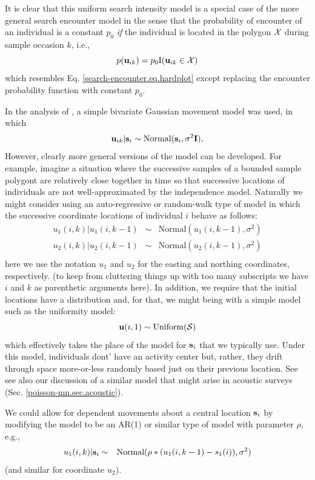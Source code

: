 It is clear that this uniform search intensity model is a
special case of the more general search encounter model in the sense
that the probability of encounter of an individual is a constant
$p_{0}$ {\it if} the individual is located in the polygon ${\cal X}$
during sample occasion $k$,  i.e.,
\[
p({\bf u}_{ik}) = p_{0} \mbox{I}({\bf u}_{ik} \in {\cal X})
\]
which resembles Eq. \ref{search-encounter.eq.hardplot} except
replacing the encounter probability function with constant $p_{0}$.

In the analysis of \citet{royle_young:2008}, a simple bivariate
Gaussian movement model was used, in which
\[
 {\bf u}_{ik} | {\bf s}_{i} \sim \mbox{Normal}({\bf s}_{i}, \sigma^{2}{\bf I}),
\]
However, clearly more general versions of the model can be developed.
For example, imagine a situation where the successive samples of a
bounded sample polygont are relatively close together in time so that
successive locations of individuals are not well-approximated by the
independence model. Naturally we might consider using an
auto-regressive or random-walk type of model in which
the successive coordinate locations of individual $i$ behave as follows:
\begin{eqnarray*}
 u_{1}(i,k) | u_{1}(i,k-1) &\sim &  \mbox{Normal}( u_{1}(i,k-1),  \sigma^{2}) \\
 u_{2}(i,k) | u_{2}(i,k-1) &\sim &  \mbox{Normal}( u_{2}(i,k-1),  \sigma^{2}) \\
\end{eqnarray*}
here we use the notation $u_{1}$ and $u_{2}$ for the easting and
northing coordinates, respectively. (to keep from cluttering things up
with too many subscripts we have $i$ and $k$ as parenthetic arguments
here).   In addition, we require that the initial locations have a
distribution and, for that, we might being with a simple model such as
the uniformity model:
\[
 {\bf u}(i,1) \sim \mbox{Uniform}({\cal S})
\]
which effectively takes the place of the model for ${\bf s}_{i}$ that
we typically use. Under this model, individuals dont' have an activity
center but, rather, they drift through space more-or-less randomly
based just on their previous location. See \citet{ovaskainen:2004,
ovaskainen:2008}
see also our discussion of a similar model that might
arise in acoustic  surveys (Sec. \ref{poisson-mn.sec.acoustic}).

We could allow for dependent movements about a central location ${\bf
  s}_{i}$ by modifying the model to be an AR(1) or similar type of
model with parameter $\rho$, e.g.,
\begin{eqnarray*}
 u_{1}(i,k) | {\bf s}_{i} &\sim &  \mbox{Normal}( \rho*( u_{1}(i,k-1)
 - s_{1}(i) ),  \sigma^{2}) \\
\end{eqnarray*}
(and similar for coordinate $u_{2}$).

